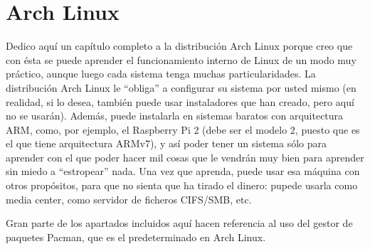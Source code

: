 \chapter{Arch Linux}\label{chapter:arch-linux}
Dedico aquí un capítulo completo a la distribución Arch Linux porque creo que con ésta se puede aprender el
funcionamiento interno de Linux de un modo muy práctico, aunque luego cada sistema tenga muchas
particularidades. La distribución Arch Linux le ``obliga'' a configurar su sistema por usted mismo (en realidad,
si lo desea, también puede usar instaladores que han creado, pero aquí no se usarán). Además, puede instalarla
en sistemas baratos con arquitectura ARM, como, por ejemplo, el Raspberry Pi 2 (debe ser el modelo 2, puesto que
es el que tiene arquitectura ARMv7), y así poder tener un sistema sólo para aprender con el que poder hacer mil
cosas que le vendrán muy bien para aprender sin miedo a ``estropear'' nada. Una vez que aprenda, puede usar esa
máquina con otros propósitos, para que no sienta que ha tirado el dinero: pupede usarla como media center, como
servidor de ficheros CIFS/SMB, etc.

Gran parte de los apartados incluidos aquí hacen referencia al uso del gestor de paquetes Pacman, que es el
predeterminado en Arch Linux.





















